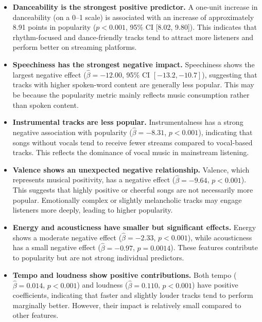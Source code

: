 \documentclass[12pt,a4paper]{article}
\begin{document}
\begin{itemize}

  \item \textbf{Danceability is the strongest positive predictor.}
        A one-unit increase in danceability (on a 0--1 scale) is associated
        with an increase of approximately 8.91 points in popularity
        ($p < 0.001$, 95\% CI [8.02, 9.80]). This indicates that
        rhythm-focused and dance-friendly tracks tend to attract more
        listeners and perform better on streaming platforms.

  \item \textbf{Speechiness has the strongest negative impact.}
        Speechiness shows the largest negative effect
        ($\hat{\beta} = -12.00$, 95\% CI $[-13.2, -10.7]$), suggesting
        that tracks with higher spoken-word content are generally less
        popular. This may be because the popularity metric mainly reflects
        music consumption rather than spoken content.

  \item \textbf{Instrumental tracks are less popular.}
        Instrumentalness has a strong negative association with popularity
        ($\hat{\beta} = -8.31$, $p < 0.001$), indicating that songs without
        vocals tend to receive fewer streams compared to vocal-based tracks.
        This reflects the dominance of vocal music in mainstream listening.

  \item \textbf{Valence shows an unexpected negative relationship.}
        Valence, which represents musical positivity, has a negative effect
        ($\hat{\beta} = -9.64$, $p < 0.001$). This suggests that highly
        positive or cheerful songs are not necessarily more popular.
        Emotionally complex or slightly melancholic tracks may engage
        listeners more deeply, leading to higher popularity.

  \item \textbf{Energy and acousticness have smaller but significant effects.}
        Energy shows a moderate negative effect ($\hat{\beta} = -2.33$,
        $p < 0.001$), while acousticness has a small negative effect
        ($\hat{\beta} = -0.97$, $p = 0.0014$). These features contribute
        to popularity but are not strong individual predictors.

  \item \textbf{Tempo and loudness show positive contributions.}
        Both tempo ($\hat{\beta} = 0.014$, $p < 0.001$) and loudness
        ($\hat{\beta} = 0.110$, $p < 0.001$) have positive coefficients,
        indicating that faster and slightly louder tracks tend to perform
        marginally better. However, their impact is relatively small
        compared to other features.


\end{itemize}
\end{document}

